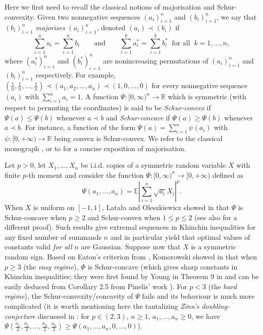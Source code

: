\documentclass[10pt]{article}
\newcommand{\E}{\mathbb{E}}
\newcommand{\1}{\textbf{1}}
\newcommand{\R}{\mathbb{R}}
\theoremstyle{remark}
\theoremstyle{definition}
\begin{document}
Here we first need to recall the classical notions of majorisation and Schur-convexity. Given two nonnegative sequences $(a_i)_{i=1}^n$ and $(b_i)_{i=1}^n$, we say that $(b_i)_{i=1}^n$ \emph{majorises} $(a_i)_{i=1}^n$, denoted $(a_i) \prec (b_i)$ if
\[
\sum_{i=1}^n a_i = \sum_{i=1}^n b_i \qquad \text{and} \qquad \sum_{i=1}^k a_i^* = \sum_{i=1}^k b_i^* \ \text{ for all } \ k = 1,\ldots,n,
\]
where $(a_i^*)_{i=1}^n$ and $(b_i^*)_{i=1}^n$ are nonincreasing permutations of $(a_i)_{i=1}^n$ and $(b_i)_{i=1}^n$ respectively. For example, $(\frac{1}{n},\frac{1}{n},\dots,\frac{1}{n}) \prec (a_1,a_2,\dots,a_n) \prec (1,0,\dots,0)$ for every nonnegative sequence $(a_i)$ with $\sum_{i=1}^n a_i = 1$. A function $\Psi\colon [0,\infty)^n \to \R$ which is symmetric (with respect to permuting the coordinates) is said to be \emph{Schur-convex} if $\Psi(a) \leq \Psi(b)$ whenever $a \prec b$ and \emph{Schur-concave} if $\Psi(a) \geq \Psi(b)$ whenever $a \prec b$. For instance, a function of the form $\Psi(a) = \sum_{i=1}^n \psi(a_i)$ with $\psi\colon [0,+\infty) \to \R$ being convex is Schur-convex. We refer to the classical monograph \cite{HLP}, or to \cite{Bh} for a concise exposition of majorisation. 

Let $p>0$, let $X_1,\ldots,X_n$ be i.i.d. copies of a symmetric random variable $X$ with finite $p$-th moment and consider the function $\Psi\colon [0,\infty)^n \to [0,+\infty)$ defined as 
\[
\Psi(a_1,\dots,a_n) = \E \left|\sum_{i=1}^n \sqrt{a_i}X_i\right|^p.\]
When $X$ is uniform on $[-1,1]$, Lata\l a and Oleszkiewicz showed in \cite{LO} that $\Psi$ is Schur-concave when $p \geq 2$ and Schur-convex when $1 \leq p \leq 2$ (see also \cite{ENT2} for a different proof). Such results give extremal sequences in Khinchin inequalities for any fixed number of summands $n$ and in particular yield that optimal values of constants valid \emph{for all} $n$ are Gaussian. Suppose now that $X$ is a symmetric random sign. Based on Eaton's criterion from \cite{Eat}, Komorowski showed in \cite{Kom} that when $p \geq 3$ (the \emph{easy regime}), $\Phi$ is Schur-concave (which gives sharp constants in Khinchin inequalities; they were first found by Young in Theorem 9 in \cite{Y} and can be easily deduced from Corollary 2.5 from Pinelis' work \cite{Pin}). For $p < 3$ (the \emph{hard regime}), the Schur-convexity/concavity of $\Psi$ fails and its behaviour is much more complicated (it is worth mentioning here the tantalizing \emph{Zinn's doubling-conjecture} discussed in \cite{Z-2}: for $p \in (2,3)$, $n\geq 1$, $a_1,\ldots,a_n \geq 0$, we have $\Psi(\frac{a_1}{2},\frac{a_1}{2},\dots,\frac{a_n}{2},\frac{a_n}{2}) \geq \Psi(a_1,\dots,a_n,0,\dots,0)$).
\end{document}
